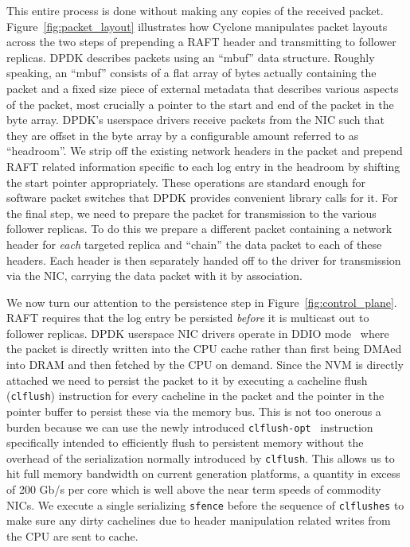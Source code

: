 \documentclass[pageno]{jpaper}
\begin{document}
This entire process is done without making any copies of the received packet.
Figure~\ref{fig:packet_layout} illustrates how
Cyclone manipulates packet layouts across the two steps of prepending a RAFT
header and transmitting to follower replicas. DPDK describes packets using an
``mbuf'' data structure. Roughly speaking, an ``mbuf'' consists of a flat array
of bytes actually containing the packet and a fixed size piece of external
metadata that describes various aspects of the packet, most crucially a pointer
to the start and end of the packet in the byte array. DPDK's userspace drivers
receive packets from the NIC such that they are offset in the byte array by a
configurable amount referred to as ``headroom''. We strip off the existing
network headers in the packet and prepend RAFT related information specific to
each log entry in the headroom by shifting the start pointer appropriately.
These operations are standard enough for software packet switches that DPDK
provides convenient library calls for it. For the final step, we need to prepare
the packet for transmission to the various follower replicas. To do this we
prepare a different packet containing a network header for \emph{each}
targeted replica and ``chain'' the data packet to each of these headers. Each
header is then separately handed off to the driver for transmission via the NIC,
carrying the data packet with it by association.

We now turn our attention to the persistence step in
Figure~\ref{fig:control_plane}. RAFT requires that the log entry be persisted
\emph{before} it is multicast out to follower replicas. DPDK userspace NIC
drivers operate in DDIO mode~\cite{ddio} where the packet is directly written
into the CPU cache rather than first being DMAed into DRAM and then fetched by
the CPU on demand. Since the NVM is directly attached we need to persist the
packet to it by executing a cacheline flush ({\tt clflush}) instruction for
every cacheline in the packet and the pointer in the pointer buffer to persist
these via the memory bus. This is not too onerous a burden because we can use
the newly introduced {\tt clflush-opt}~\cite{clflush_opt} instruction
specifically intended to efficiently flush to persistent memory without the
overhead of the serialization normally introduced by {\tt clflush}. This allows
us to hit full memory bandwidth on current generation platforms, a quantity in
excess of 200 Gb/s per core which is well above the near term speeds of 
commodity NICs. We execute a single serializing {\tt sfence} 
before the sequence of {\tt clflushes} to make sure any dirty cachelines due to
header manipulation related writes from the CPU are sent to cache.
\end{document}
